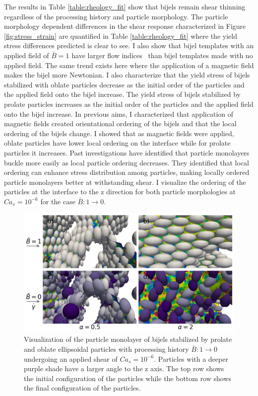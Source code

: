 The results in Table \ref{table:rheology_fit} show that bijels remain shear thinning regardless of the processing history and particle morphology.
The particle morphology dependent differences in the shear response characterized in Figure \ref{fig:stress_strain} are quantified in Table \ref{table:rheology_fit}
where the yield stress differences predicted is clear to see. I also show that bijel templates with an applied field of $\bar{B} = 1$ have larger flow indices \
than bijel templates made with no applied field. The same trend exists here where the application of a magnetic field makes the bijel more Newtonian. I also 
characterize that the yield stress of bijels stabilized with oblate particles decrease as the initial order of the particles and the applied field onto the bijel increase. 
The yield stress of bijels stabilized by prolate particles increases as the initial order of the particles and the applied field onto the bijel increase. In previous aims, I 
characterized that application of magnetic fields created orientational ordering of the bijels and that the local ordering of the bijels change. I 
showed that as magnetic fields were applied, oblate particles have lower local ordering on the interface while for prolate particles it increases.
Past investigations have identified that particle monolayers buckle more easily as local particle ordering decreases. \cite{prakash_buckling_2024} 
They identified that local ordering can enhance stress distribution among particles, making locally ordered particle monolayers better at withstanding shear.
I visualize the ordering of the particles at the interface to the z direction for both particle morphologies at $Ca_s = 10^{-6}$ for the 
case $\bar{B}: 1 \rightarrow 0$.

\begin{figure} 
    \centering 
    \includegraphics[scale=0.4]{../figures/results/paper3/tz_concat_startB-1_endB-0.png} 
    \caption{Visualization of the particle monolayer of bijels stabilized by prolate and oblate ellipsoidal particles with processing history $\bar{B}: 1 \rightarrow 0$
             undergoing an applied shear of $Ca_s = 10^{-6}$. Particles with a deeper purple shade have a larger angle to the z axis. The top row shows the initial 
             configuration of the particles while the bottom row shows the final configuration of the particles. } 
    \label{fig:particle_viz_tz} 
\end{figure}

